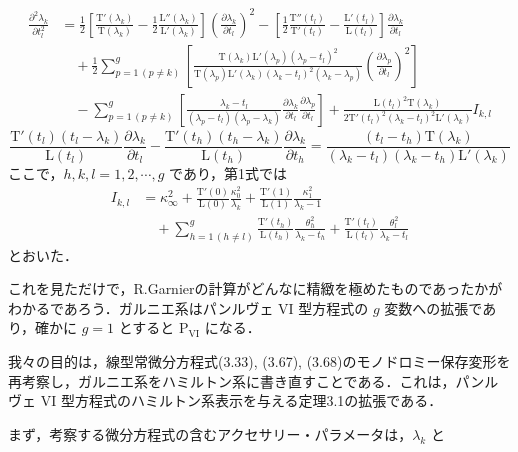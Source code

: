 \begin{definition}
\begin{align}
\frac{\partial^2 \lambda_k}{\partial t_l^2} &= \frac{1}{2} \left[ \frac{\mathrm{T}'(\lambda_k)}{\mathrm{T}(\lambda_k)} - \frac{1}{2} \frac{\mathrm{L}''(\lambda_k)}{\mathrm{L}'(\lambda_k)} \right] \left( \frac{\partial \lambda_k}{\partial t_l} \right)^2 - \left[ \frac{1}{2} \frac{\mathrm{T}''(t_l)}{\mathrm{T}'(t_l)} - \frac{\mathrm{L}'(t_l)}{\mathrm{L}(t_l)} \right] \frac{\partial \lambda_k}{\partial t_l} \nonumber \\
&\quad + \frac{1}{2} \sum_{p=1 \, (p \neq k)}^g \left[ \frac{\mathrm{T}(\lambda_k)\mathrm{L}'(\lambda_p)(\lambda_p - t_l)^2}{\mathrm{T}(\lambda_p)\mathrm{L}'(\lambda_k)(\lambda_k - t_l)^2(\lambda_k - \lambda_p)} \left( \frac{\partial \lambda_p}{\partial t_l} \right)^2 \right] \nonumber \\
&\quad - \sum_{p=1 \, (p \neq k)}^g \left[ \frac{\lambda_k - t_l}{(\lambda_p - t_l)(\lambda_p - \lambda_k)} \frac{\partial \lambda_k}{\partial t_l} \frac{\partial \lambda_p}{\partial t_l} \right] + \frac{\mathrm{L}(t_l)^2 \mathrm{T}(\lambda_k)}{2\mathrm{T}'(t_l)^2(\lambda_k - t_l)^2 \mathrm{L}'(\lambda_k)} I_{k,l} \label{eq:Garnier1}
\end{align}
\begin{equation}
\frac{\mathrm{T}'(t_l)(t_l - \lambda_k)}{\mathrm{L}(t_l)} \frac{\partial \lambda_k}{\partial t_l} - \frac{\mathrm{T}'(t_h)(t_h - \lambda_k)}{\mathrm{L}(t_h)} \frac{\partial \lambda_k}{\partial t_h} = \frac{(t_l - t_h)\mathrm{T}(\lambda_k)}{(\lambda_k - t_l)(\lambda_k - t_h)\mathrm{L}'(\lambda_k)} \label{eq:Garnier2}
\end{equation}
ここで，$h, k, l = 1, 2, \cdots, g$ であり，第1式では
\begin{align}
I_{k,l} &= \kappa_\infty^2 + \frac{\mathrm{T}'(0)}{\mathrm{L}(0)}\frac{\kappa_0^2}{\lambda_k} + \frac{\mathrm{T}'(1)}{\mathrm{L}(1)}\frac{\kappa_1^2}{\lambda_k - 1} \nonumber \\
&\quad + \sum_{h=1 \, (h \neq l)}^g \frac{\mathrm{T}'(t_h)}{\mathrm{L}(t_h)}\frac{\theta_h^2}{\lambda_k - t_h} + \frac{\mathrm{T}'(t_l)}{\mathrm{L}(t_l)}\frac{\theta_l^2}{\lambda_k - t_l} \label{eq:Garnier_I}
\end{align}
とおいた．
\end{definition}

\begin{story}
これを見ただけで，R.Garnierの計算がどんなに精緻を極めたものであったかがわかるであろう．ガルニエ系はパンルヴェ $\mathrm{VI}$ 型方程式の $g$ 変数への拡張であり，確かに $g=1$ とすると $\mathrm{P_{VI}}$ になる．

我々の目的は，線型常微分方程式(3.33), (3.67), (3.68)のモノドロミー保存変形を再考察し，ガルニエ系をハミルトン系に書き直すことである．これは，パンルヴェ $\mathrm{VI}$ 型方程式のハミルトン系表示を与える定理3.1の拡張である．

まず，考察する微分方程式の含むアクセサリー・パラメータは，$\lambda_k$ と
\end{story}

